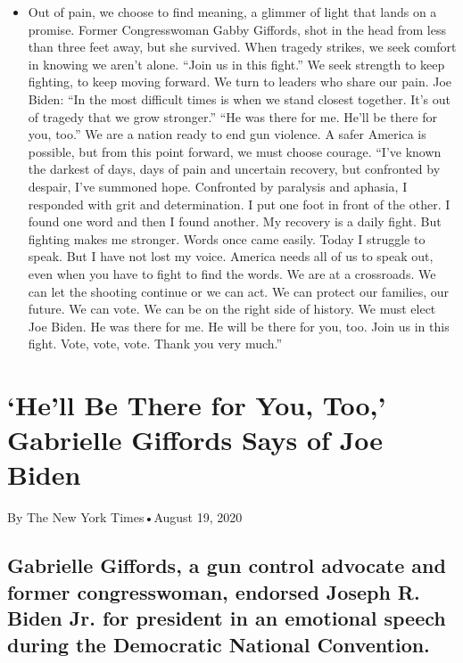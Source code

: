 \begin{itemize}
\tightlist
\item
  Out of pain, we choose to find meaning, a glimmer of light that lands
  on a promise. Former Congresswoman Gabby Giffords, shot in the head
  from less than three feet away, but she survived. When tragedy
  strikes, we seek comfort in knowing we aren't alone. ``Join us in this
  fight.'' We seek strength to keep fighting, to keep moving forward. We
  turn to leaders who share our pain. Joe Biden: ``In the most difficult
  times is when we stand closest together. It's out of tragedy that we
  grow stronger.'' ``He was there for me. He'll be there for you, too.''
  We are a nation ready to end gun violence. A safer America is
  possible, but from this point forward, we must choose courage. ``I've
  known the darkest of days, days of pain and uncertain recovery, but
  confronted by despair, I've summoned hope. Confronted by paralysis and
  aphasia, I responded with grit and determination. I put one foot in
  front of the other. I found one word and then I found another. My
  recovery is a daily fight. But fighting makes me stronger. Words once
  came easily. Today I struggle to speak. But I have not lost my voice.
  America needs all of us to speak out, even when you have to fight to
  find the words. We are at a crossroads. We can let the shooting
  continue or we can act. We can protect our families, our future. We
  can vote. We can be on the right side of history. We must elect Joe
  Biden. He was there for me. He will be there for you, too. Join us in
  this fight. Vote, vote, vote. Thank you very much.''
\end{itemize}

\hypertarget{hell-be-there-for-you-too-gabrielle-giffords-says-of-joe-biden-1}{%
\section{`He'll Be There for You, Too,' Gabrielle Giffords Says of Joe
Biden}\label{hell-be-there-for-you-too-gabrielle-giffords-says-of-joe-biden-1}}

By The New York Times•August 19, 2020

\hypertarget{gabrielle-giffords-a-gun-control-advocate-and-former-congresswoman-endorsed-joseph-r-biden-jr-for-president-in-an-emotional-speech-during-the-democratic-national-convention-1}{%
\subsection{Gabrielle Giffords, a gun control advocate and former
congresswoman, endorsed Joseph R. Biden Jr. for president in an
emotional speech during the Democratic National
Convention.}\label{gabrielle-giffords-a-gun-control-advocate-and-former-congresswoman-endorsed-joseph-r-biden-jr-for-president-in-an-emotional-speech-during-the-democratic-national-convention-1}}

